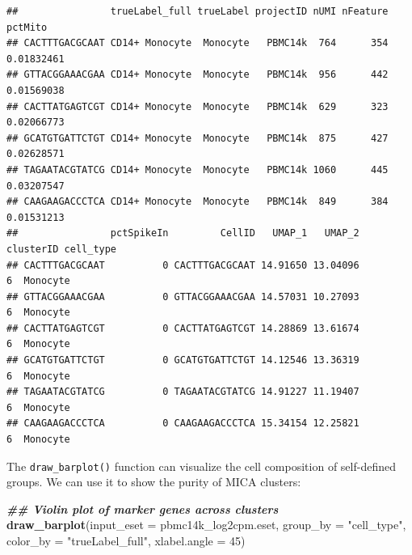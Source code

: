 \documentclass[
  12pt,
]{book}
\newenvironment{Shaded}{\begin{snugshade}}{\end{snugshade}}
\newcommand{\AttributeTok}[1]{\textcolor[rgb]{0.13,0.29,0.53}{#1}}
\newcommand{\DecValTok}[1]{\textcolor[rgb]{0.00,0.00,0.81}{#1}}
\newcommand{\DocumentationTok}[1]{\textcolor[rgb]{0.56,0.35,0.01}{\textbf{\textit{#1}}}}
\newcommand{\FunctionTok}[1]{\textcolor[rgb]{0.13,0.29,0.53}{\textbf{#1}}}
\newcommand{\NormalTok}[1]{#1}
\newcommand{\StringTok}[1]{\textcolor[rgb]{0.31,0.60,0.02}{#1}}
\begin{document}
\begin{verbatim}
##                trueLabel_full trueLabel projectID nUMI nFeature    pctMito
## CACTTTGACGCAAT CD14+ Monocyte  Monocyte   PBMC14k  764      354 0.01832461
## GTTACGGAAACGAA CD14+ Monocyte  Monocyte   PBMC14k  956      442 0.01569038
## CACTTATGAGTCGT CD14+ Monocyte  Monocyte   PBMC14k  629      323 0.02066773
## GCATGTGATTCTGT CD14+ Monocyte  Monocyte   PBMC14k  875      427 0.02628571
## TAGAATACGTATCG CD14+ Monocyte  Monocyte   PBMC14k 1060      445 0.03207547
## CAAGAAGACCCTCA CD14+ Monocyte  Monocyte   PBMC14k  849      384 0.01531213
##                pctSpikeIn         CellID   UMAP_1   UMAP_2 clusterID cell_type
## CACTTTGACGCAAT          0 CACTTTGACGCAAT 14.91650 13.04096         6  Monocyte
## GTTACGGAAACGAA          0 GTTACGGAAACGAA 14.57031 10.27093         6  Monocyte
## CACTTATGAGTCGT          0 CACTTATGAGTCGT 14.28869 13.61674         6  Monocyte
## GCATGTGATTCTGT          0 GCATGTGATTCTGT 14.12546 13.36319         6  Monocyte
## TAGAATACGTATCG          0 TAGAATACGTATCG 14.91227 11.19407         6  Monocyte
## CAAGAAGACCCTCA          0 CAAGAAGACCCTCA 15.34154 12.25821         6  Monocyte
\end{verbatim}

The \texttt{draw\_barplot()} function can visualize the cell composition of self-defined groups. We can use it to show the purity of MICA clusters:

\begin{Shaded}
\begin{Highlighting}[]
\DocumentationTok{\#\# Violin plot of marker genes across clusters}
\FunctionTok{draw\_barplot}\NormalTok{(}\AttributeTok{input\_eset =}\NormalTok{ pbmc14k\_log2cpm.eset, }\AttributeTok{group\_by =} \StringTok{"cell\_type"}\NormalTok{, }\AttributeTok{color\_by =} \StringTok{"trueLabel\_full"}\NormalTok{, }\AttributeTok{xlabel.angle =} \DecValTok{45}\NormalTok{)}
\end{Highlighting}
\end{Shaded}
\end{document}
